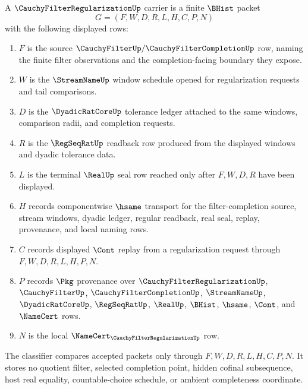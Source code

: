 \begin{definition}
\label{def:cauchy-filter-regularization-carrier}
A $\CauchyFilterRegularizationUp$ carrier is a finite $\BHist$ packet
$$
G=(F,W,D,R,L,H,C,P,N)
$$
with the following displayed rows:
\begin{enumerate}
\item $F$ is the source $\CauchyFilterUp/\CauchyFilterCompletionUp$ row, naming the finite filter observations and the completion-facing boundary they expose.
\item $W$ is the $\StreamNameUp$ window schedule opened for regularization requests and tail comparisons.
\item $D$ is the $\DyadicRatCoreUp$ tolerance ledger attached to the same windows, comparison radii, and completion requests.
\item $R$ is the $\RegSeqRatUp$ readback row produced from the displayed windows and dyadic tolerance data.
\item $L$ is the terminal $\RealUp$ seal row reached only after $F,W,D,R$ have been displayed.
\item $H$ records componentwise $\hsame$ transport for the filter-completion source, stream windows, dyadic ledger, regular readback, real seal, replay, provenance, and local naming rows.
\item $C$ records displayed $\Cont$ replay from a regularization request through $F,W,D,R,L,H,P,N$.
\item $P$ records $\Pkg$ provenance over $\CauchyFilterRegularizationUp$, $\CauchyFilterUp$, $\CauchyFilterCompletionUp$, $\StreamNameUp$, $\DyadicRatCoreUp$, $\RegSeqRatUp$, $\RealUp$, $\BHist$, $\hsame$, $\Cont$, and $\NameCert$ rows.
\item $N$ is the local $\NameCert_{\CauchyFilterRegularizationUp}$ row.
\end{enumerate}
The classifier compares accepted packets only through $F,W,D,R,L,H,C,P,N$. It stores no quotient filter, selected completion point, hidden cofinal subsequence, host real equality, countable-choice schedule, or ambient completeness coordinate.
\end{definition}

